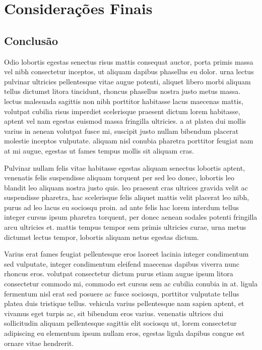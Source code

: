 \chapter{Considerações Finais}

\section{Conclusão}

Odio lobortis egestas senectus risus mattis consequat auctor, porta primis massa vel nibh consectetur inceptos, ut aliquam dapibus phasellus eu dolor. urna lectus pulvinar ultricies pellentesque vitae augue potenti, aliquet libero morbi aliquam tellus dictumst litora tincidunt, rhoncus phasellus nostra justo metus massa. lectus malesuada sagittis non nibh porttitor habitasse lacus maecenas mattis, volutpat cubilia risus imperdiet scelerisque praesent dictum lorem habitasse, aptent vel nam egestas euismod massa fringilla ultricies. a at platea dui mollis varius in aenean volutpat fusce mi, suscipit justo nullam bibendum placerat molestie inceptos vulputate. aliquam nisl conubia pharetra porttitor feugiat nam at mi augue, egestas ut fames tempus mollis sit aliquam cras. 

	Pulvinar nullam felis vitae habitasse egestas aliquam senectus lobortis aptent, venenatis felis suspendisse aliquam torquent per sed leo donec, lobortis leo blandit leo aliquam nostra justo quis. leo praesent cras ultrices gravida velit ac suspendisse pharetra, hac scelerisque felis aliquet mattis velit placerat leo nibh, purus ad leo lacus eu sociosqu proin. ad ante felis hac lorem interdum tellus integer cursus ipsum pharetra torquent, per donec aenean sodales potenti fringilla arcu ultricies et. mattis tempus tempor sem primis ultricies curae, urna metus dictumst lectus tempor, lobortis aliquam netus egestas dictum. 

	Varius erat fames feugiat pellentesque eros laoreet lacinia integer condimentum sed vulputate, integer condimentum eleifend maecenas dapibus viverra nunc rhoncus eros. volutpat consectetur dictum purus etiam augue ipsum litora consectetur commodo mi, commodo est cursus sem ac cubilia conubia in at. ligula fermentum nisl erat sed posuere ac fusce sociosqu, porttitor vulputate tellus platea duis tristique tellus. vehicula varius pellentesque nam sapien aptent, et vivamus eget turpis ac, sit bibendum eros varius. venenatis ultrices dui sollicitudin aliquam pellentesque sagittis elit sociosqu ut, lorem consectetur adipiscing eu elementum ipsum nullam eros, egestas ligula dapibus congue est ornare vitae hendrerit. 

